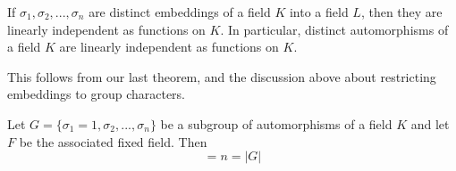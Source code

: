 \begin{cor}
    If $\sigma_1,\sigma_2,...,\sigma_n$ are distinct embeddings of a field $K$ into a field $L$, then they are linearly independent as functions on $K$. In particular, distinct automorphisms of a field $K$ are linearly independent as functions on $K$.
\end{cor}
This follows from our last theorem, and the discussion above about restricting embeddings to group characters.

\begin{thm}\label{thm:subfixed}
    Let $G=\{\sigma_1 = 1,\sigma_2,...,\sigma_n\}$ be a subgroup of automorphisms of a field $K$ and let $F$ be the associated fixed field. Then \begin{equation*}
        [K:F] = n = |G|
    \end{equation*}
\end{thm}

